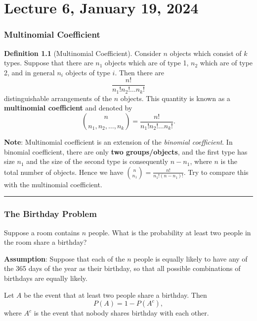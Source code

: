 \documentclass[
]{book}
\theoremstyle{definition}
\newtheorem{definition}{Definition}[chapter]
\theoremstyle{definition}
\theoremstyle{definition}
\theoremstyle{definition}
\theoremstyle{remark}
\begin{document}
\hypertarget{lecture-6-january-19-2024}{%
\chapter{Lecture 6, January 19, 2024}\label{lecture-6-january-19-2024}}

\hypertarget{multinomial-coefficient}{%
\subsection{Multinomial Coefficient}\label{multinomial-coefficient}}

\begin{definition}[Multinomial Coefficient]
Consider \(n\) objects which consist of \(k\) types. Suppose that there are \(n_1\) objects which are of type 1, \(n_2\) which are of type 2, and in general \(n_i\) objects of type \(i\). Then there are
\[
\frac{n!}{n_1 ! n_2! \dots n_k !}
\]
distinguishable arrangements of the \(n\) objects. This quantity is known as a \textbf{multinomial coefficient} and denoted by
\[
\binom{n}{n_1,n_2,\dots,n_k}= \frac{n !}{n_1 ! n_2! \dots n_k !}.
\]
\end{definition}

\textbf{Note}: Multinomial coefficient is an extension of the \emph{binomial coefficient}. In binomial coefficient, there are only \textbf{two groups/objects}, and the first type has size \(n_1\) and the size of the second type is consequently \(n-n_1\), where \(n\) is the total number of objects. Hence we have \({n \choose n_1} = \frac{n!}{n_1! (n-n_1)!}\). Try to compare this with the multinomial coefficient.

\begin{center}\rule{0.5\linewidth}{0.5pt}\end{center}

\hypertarget{the-birthday-problem}{%
\subsection{The Birthday Problem}\label{the-birthday-problem}}

Suppose a room contains \(n\) people. What is the probability at least two people in the room share a birthday?

\textbf{Assumption}: Suppose that each of the \(n\) people is equally likely to have any of the 365 days of the year as their birthday, so that all possible combinations of birthdays are equally likely.

Let \(A\) be the event that at least two people share a birthday. Then
\[ P(A) = 1 - P(A^c),\]
where \(A^c\) is the event that nobody shares birthday with each other.
\end{document}
